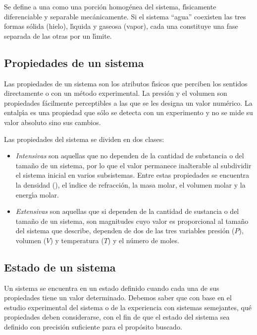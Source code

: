Se define a una  como una porci\'on homog\'enea del sistema, f\'{\i}sica\-mente diferenciable y separable mec\'anicamente. Si el sistema ``agua'' coexisten las tres formas s\'olida (hielo), l\'{\i}quida y gaseosa (vapor), cada una constituye una fase separada de las otras por un l\'{\i}mite.


\subsection{Propiedades de un sistema}
Las propiedades de un sistema son los atributos f\'{\i}sicos que perciben los sentidos directamente o con un m\'etodo experimental. La presi\'on y el vo\-lumen son propiedades f\'acilmente perceptibles a las que se les designa un valor num\'erico. La entalp\'{\i}a es una propiedad que s\'olo se detecta con un experimento y no se mide su valor absoluto sino sus cambios.

Las propiedades del sistema se dividen en dos clases:

\begin{itemize}
\item \textit{Intensivas}  son aquellas que no dependen de la cantidad de substancia o del tama\~no de un sistema, por lo que el valor permanece inalterable al subdividir el sistema inicial en varios subsistemas. Entre estas propiedades se encuentra la densidad (), el \'{\i}ndice de refracci\'on, la masa molar, el volumen molar y la e\-nerg\'{\i}a molar. 
\item \textit{Extensivas} son aquellas que si dependen de la cantidad de sustancia o del tama\~no de un sistema, son magnitudes cuyo valor es proporcional al tama\~no del sistema que describe, dependen de dos de las tres variables presi\'on ($P$), volumen ($V$) y temperatura ($T$) y el n\'umero de moles.
\end{itemize}

\subsection{Estado de un sistema}
Un sistema se encuentra en un estado definido cuando cada una de sus propiedades tiene un valor determinado. Debemos saber que con base en el estudio experimental del sistema o de la experiencia con sistemas semejantes, qu\'e propiedades deben considerarse, con el fin de que el estado del sistema sea definido con precisi\'on suficiente para el prop\'osito buscado.


